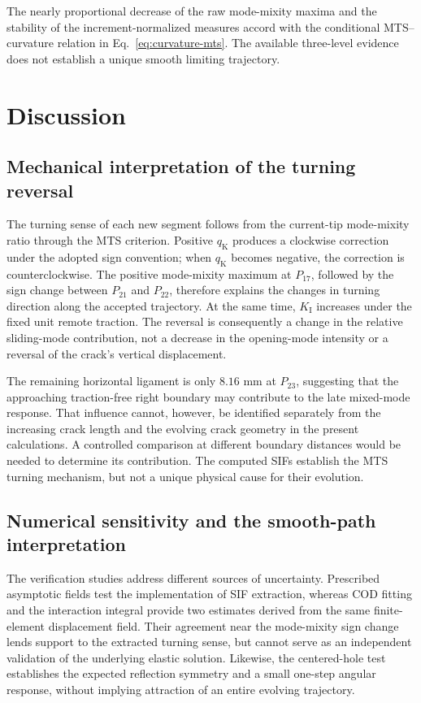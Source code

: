\documentclass[pdflatex,sn-mathphys-num]{sn-jnl}
\newcommand{\LastLigamentMM}{8.16}
\begin{document}
\begin{samepage}
The nearly proportional decrease of the raw mode-mixity
maxima and the stability of the increment-normalized
measures accord with the conditional MTS--curvature
relation in Eq.~\eqref{eq:curvature-mts}. The available
three-level evidence does not establish a unique smooth
limiting trajectory.
\end{samepage}

\section{Discussion}
\label{sec:discussion}
\subsection{Mechanical interpretation of the turning reversal}
The turning sense of each new segment follows from the current-tip
mode-mixity ratio through the MTS criterion. Positive
$q_{\mathrm{K}}$ produces a clockwise correction under the adopted
sign convention; when $q_{\mathrm{K}}$ becomes negative, the correction
is counterclockwise. The positive mode-mixity maximum at $P_{17}$,
followed by the sign change between $P_{21}$ and $P_{22}$, therefore
explains the changes in turning direction along the accepted
trajectory. At the same time, $K_{\mathrm{I}}$ increases under the
fixed unit remote traction. The reversal is consequently a change in
the relative sliding-mode contribution, not a decrease in the
opening-mode intensity or a reversal of the crack's vertical
displacement.

The remaining horizontal ligament is only $\LastLigamentMM$ mm at
$P_{23}$, suggesting that the approaching traction-free right
boundary may contribute to the late mixed-mode response. That
influence cannot, however, be identified separately from the
increasing crack length and the evolving crack geometry in the
present calculations. A controlled comparison at different
boundary distances would be needed to determine its contribution.
The computed SIFs establish the MTS turning mechanism, but not
a unique physical cause for their evolution.

\subsection{Numerical sensitivity and the smooth-path interpretation}
The verification studies address different sources of uncertainty.
Prescribed asymptotic fields test the implementation of SIF
extraction, whereas COD fitting and the interaction integral
provide two estimates derived from the same finite-element
displacement field. Their agreement near the mode-mixity sign
change lends support to the extracted turning sense, but cannot
serve as an independent validation of the underlying elastic
solution. Likewise, the centered-hole test establishes the
expected reflection symmetry and a small one-step angular
response, without implying attraction of an entire evolving
trajectory.
\end{document}
